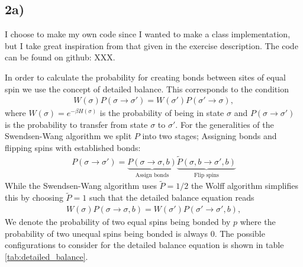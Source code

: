 \documentclass[reprint, amsmath, amssymb, aps, onecolumn]{revtex4-2}
\begin{document}
\subsection*{2a)}
\noindent I choose to make my own code since I wanted to make a class implementation, but I take great inspiration from that given in the exercise description. The code can be found on github: XXX. \par
In order to calculate the probability for creating bonds between sites of equal spin we use the concept of detailed balance. This corresponds to the condition
\begin{align*}
  W(\sigma)P(\sigma\to\sigma') = W(\sigma')P(\sigma'\to\sigma),
\end{align*}
where $W(\sigma) = e^{-\beta H(\sigma)}$ is the probability of being in state $\sigma$ and $P(\sigma\to\sigma')$ is the probability to transfer from state $\sigma$ to $\sigma'$. For the generalities of the Swendsen-Wang algorithm we split $P$ into two stages; Assigning bonds and flipping spins with established bonds:
\begin{align*}
  P(\sigma \to \sigma') = \underbrace{P(\sigma \to \sigma, b)}_{\text{Assign bonds}} \underbrace{\tilde{P}(\sigma, b \to\sigma',b)}_{\text{Flip spins}}
\end{align*}
While the Swendsen-Wang algorithm uses $\tilde{P} = 1/2$ the Wolff algorithm simplifies this by choosing $\tilde{P}=1$ such that the detailed balance equation reads 
\begin{align*}
  W(\sigma)P(\sigma\to\sigma, b) = W(\sigma')P(\sigma'\to\sigma', b),
\end{align*}
We denote the probability of two equal spins being bonded by $p$ where the probability of two unequal spins being bonded is always 0. The possible configurations to consider for the detailed balance equation is shown in table \ref{tab:detailed_balance}.
\end{document}
